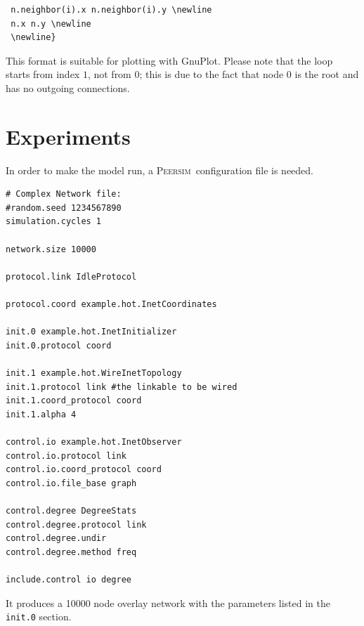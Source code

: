 \documentclass[a4paper,11pt]{article}
\newcommand{\id}[1]{{\scshape\small #1}}
\newcommand{\psim}{\id{Peersim}}
\begin{document}
\footnotesize
\begin{verbatim}
 n.neighbor(i).x n.neighbor(i).y \newline
 n.x n.y \newline
 \newline}
\end{verbatim}
\normalsize 

This format is suitable for plotting with GnuPlot. 
Please note that the loop starts from index $1$, not from $0$;
this is due to the fact that node 0 is the root and has no outgoing
connections.

\section{Experiments}
\label{s:experiments}

In order to make the model run, a \psim\ configuration file is 
needed.

\footnotesize
\begin{verbatim}
# Complex Network file:
#random.seed 1234567890
simulation.cycles 1

network.size 10000

protocol.link IdleProtocol

protocol.coord example.hot.InetCoordinates

init.0 example.hot.InetInitializer
init.0.protocol coord

init.1 example.hot.WireInetTopology
init.1.protocol link #the linkable to be wired
init.1.coord_protocol coord
init.1.alpha 4

control.io example.hot.InetObserver
control.io.protocol link
control.io.coord_protocol coord
control.io.file_base graph

control.degree DegreeStats
control.degree.protocol link
control.degree.undir
control.degree.method freq

include.control io degree
\end{verbatim}
\normalsize

It produces a 10000 node overlay network with the parameters listed in 
the \texttt{init.0} section.
\end{document}
